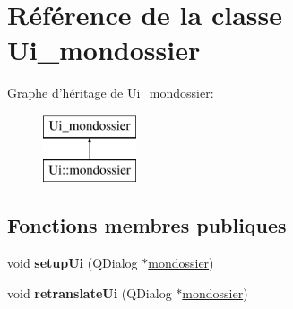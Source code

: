 \hypertarget{class_ui__mondossier}{\section{Référence de la classe Ui\+\_\+mondossier}
\label{class_ui__mondossier}
}
Graphe d'héritage de Ui\+\_\+mondossier\+:\begin{figure}[H]
\begin{center}
\leavevmode
\includegraphics[height=2.000000cm]{class_ui__mondossier}
\end{center}
\end{figure}
\subsection*{Fonctions membres publiques}
\begin{DoxyCompactItemize}
\item 
\hypertarget{class_ui__mondossier_ac4de344ebe23f344d4be204ef04526f5}{void {\bfseries setup\+Ui} (Q\+Dialog $\ast$\hyperlink{classmondossier}{mondossier})}\label{class_ui__mondossier_ac4de344ebe23f344d4be204ef04526f5}

\item 
\hypertarget{class_ui__mondossier_a841ade5774bce5733def3e26bb9f6016}{void {\bfseries retranslate\+Ui} (Q\+Dialog $\ast$\hyperlink{classmondossier}{mondossier})}\label{class_ui__mondossier_a841ade5774bce5733def3e26bb9f6016}

\end{DoxyCompactItemize}
